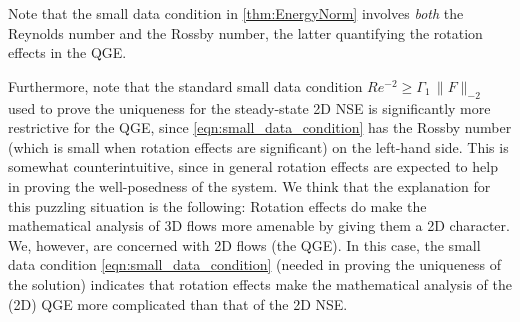 \begin{remark}
  Note that the small data condition in \autoref{thm:EnergyNorm} involves
  \emph{both} the Reynolds number and the Rossby number, the latter quantifying
  the rotation effects in the QGE.

  Furthermore, note that the standard small data condition $Re^{-2} \geq
  \Gamma_1 \, \| F \|_{-2}$ used to prove the uniqueness for the steady-state 2D
  NSE \cite{Girault79,Girault86,Layton08} is significantly more restrictive for
  the QGE, since \eqref{eqn:small_data_condition} has the Rossby number (which
  is small when rotation effects are significant) on the left-hand side.  This
  is somewhat counterintuitive, since in general rotation effects are expected
  to help in proving the well-posedness of the system.  We think that the
  explanation for this puzzling situation is the following: Rotation effects do
  make the mathematical analysis of 3D flows more amenable by giving them a 2D
  character.  We, however, are concerned with 2D flows (the QGE).  In this case,
  the small data condition \eqref{eqn:small_data_condition} (needed in proving
  the uniqueness of the solution) indicates that rotation effects make the
  mathematical analysis of the (2D) QGE more complicated than that of the 2D
  NSE. %
\end{remark}
